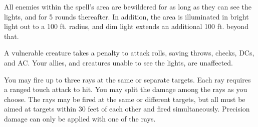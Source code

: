 \begin{comment}
\subsubsection{S}
\end{comment}

\spelldur{\durshort}
\begin{spelleffect}
  All enemies within the spell's area are bewildered for as long as they can see the lights, and for 5 rounds thereafter. In addition, the area is illuminated in bright light out to a 100 ft. radius, and dim light extends an additional 100 ft. beyond that.
\end{spelleffect}
\begin{spellnotes}
  A vulnerable creature takes a  penalty to attack rolls, saving throws, checks, DCs, and AC. Your allies, and creatures unable to see the lights, are unaffected.
\end{spellnotes}

\spellrng{\rngclose}
\begin{spelleffect}
  You may fire up to three rays at the same or separate targets. Each ray requires a ranged touch attack to hit. You may split the damage among the rays as you choose. The rays may be fired at the same or different targets, but all must be aimed at targets within 30 feet of each other and fired simultaneously. Precision damage can only be applied with one of the rays.
\end{spelleffect}

